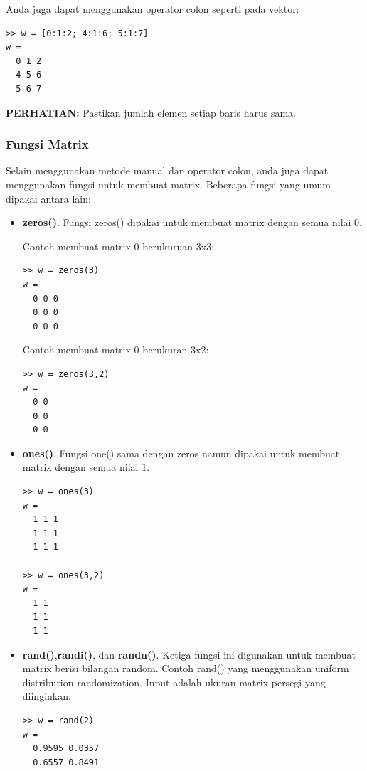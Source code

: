 \documentclass[12pt]{book}
\begin{document}
	Anda juga dapat menggunakan operator colon seperti pada vektor:
	\begin{verbatim}
>> w = [0:1:2; 4:1:6; 5:1:7]
w = 
  0 1 2
  4 5 6 
  5 6 7
	\end{verbatim}

	\textbf{PERHATIAN:} Pastikan jumlah elemen setiap baris harus sama.
	
	\subsubsection{Fungsi Matrix}
	
	Selain menggunakan metode manual dan operator colon, anda juga dapat menggunakan fungsi untuk membuat matrix.
	Beberapa fungsi yang umum dipakai antara lain:
	\begin{itemize}
		\item \textbf{zeros()}. Fungsi zeros() dipakai untuk membuat matrix dengan semua nilai 0.
		
		Contoh membuat matrix 0 berukuruan 3x3:
		\begin{verbatim}
>> w = zeros(3)
w = 
  0 0 0
  0 0 0
  0 0 0
		\end{verbatim}
	
		Contoh membuat matrix 0 berukuran 3x2:
		\begin{verbatim}
>> w = zeros(3,2)
w = 
  0 0
  0 0
  0 0
		\end{verbatim}
	
		\item \textbf{ones()}. Fungsi one() sama dengan zeros namun dipakai untuk membuat matrix dengan semua nilai 1.
		\begin{verbatim}
>> w = ones(3)
w = 
  1 1 1
  1 1 1
  1 1 1
  
>> w = ones(3,2)
w =
  1 1
  1 1
  1 1
		\end{verbatim}
	
		\item \textbf{rand()},\textbf{randi()}, dan \textbf{randn()}. Ketiga fungsi ini digunakan untuk membuat matrix berisi bilangan random.
		Contoh rand() yang menggunakan uniform distribution randomization. Input adalah ukuran matrix persegi yang diinginkan:
		\begin{verbatim}
>> w = rand(2)
w =
  0.9595 0.0357
  0.6557 0.8491
		\end{verbatim}
	

\end{itemize}
\end{document}
